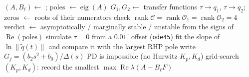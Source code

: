 \begin{algorithm}[H]
\caption{Stability analysis and single-angle test (\texttt{Acrobot\_Phase2\_Main.m})}
\label{alg:p2}
\begin{algorithmic}[1]
  \State $(A,B_\ell)\gets$ ; \quad poles $\gets\operatorname{eig}(A)$
  \State $G_1,G_2\gets$ transfer functions $\tau\to q_1$, $\tau\to q_2$; \quad zeros $\gets$ roots of their numerators
  \State check $\operatorname{rank}\mathcal C=\operatorname{rank}\mathcal O_1=\operatorname{rank}\mathcal O_2=4$ 
  \State verdict $\gets$ asymptotically / marginally stable / unstable from the signs of $\operatorname{Re}(\text{poles})$
\EndFor
{} 
  \State simulate $\tau=0$ from a $0.01^\circ$ offset (\texttt{ode45})
  \State fit the slope of $\ln\|\tilde q(t)\|$ and compare it with the largest RHP pole
\EndFor
{} 
  \State write $G_j=(b_2s^2+b_0)/\Delta(s)$
   \State PD is impossible (no Hurwitz $K_p,K_d$) \EndIf
  \State grid-search $(K_p,K_d)$: record the smallest $\max\operatorname{Re}\lambda(A-B_\ell F)$
\EndFor
\end{algorithmic}
\end{algorithm}
